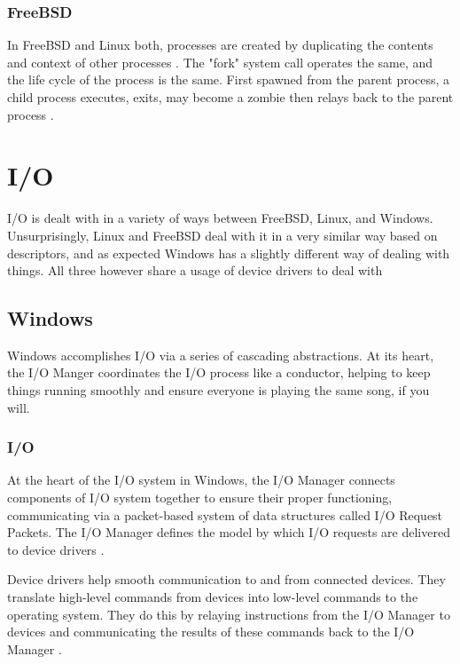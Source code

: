 \documentclass[10pt,draftclsnofoot,onecolumn,compsoc]{IEEEtran}
\begin{document}
	\subsubsection{FreeBSD}
	
	In FreeBSD and Linux both, processes are created by duplicating the contents and context of other processes \cite{BSD}. The "fork" system call operates the same, and the life cycle of the process is the same. First spawned from the parent process, a child process executes, exits, may become a zombie then relays back to the parent process \cite{BSD}.
	
	\section{I/O}
	
	I/O is dealt with in a variety of ways between FreeBSD, Linux, and Windows. Unsurprisingly, Linux and FreeBSD deal with it in a very similar way based on descriptors, and as expected Windows has a slightly different way of dealing with things. All three however share a usage of device drivers to deal with 
	
	\subsection{Windows}
	
	Windows accomplishes I/O via a series of cascading abstractions. At its heart, the I/O Manger coordinates the I/O process like a conductor, helping to keep things running smoothly and ensure everyone is playing the same song, if you will.
	
	\subsubsection{I/O}
	
	At the heart of the I/O system in Windows, the I/O Manager connects components of I/O system together to ensure their proper functioning, communicating via a packet-based system of data structures called I/O Request Packets. The I/O Manager defines the model by which I/O requests are delivered to device drivers \cite{WInternals}.
	
	Device drivers help smooth communication to and from connected devices. They translate high-level commands from devices into low-level commands to the operating system. They do this by relaying instructions from the I/O Manager to devices and communicating the results of these commands back to the I/O Manager \cite{WInternals}.
	
\end{document}
